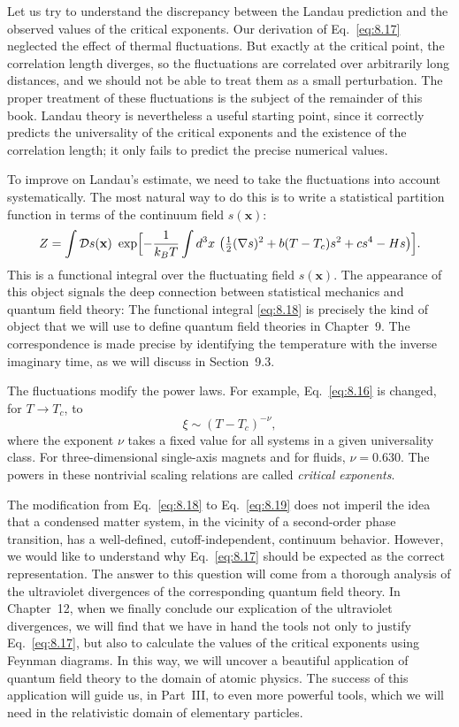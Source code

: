 Let us try to understand the discrepancy between the Landau prediction and
the observed values of the critical exponents.  Our derivation of
Eq.~\eqref{eq:8.17} neglected the effect of thermal fluctuations.  But exactly
at the critical point, the correlation length diverges, so the fluctuations
are correlated over arbitrarily long distances, and we should not be able to
treat them as a small perturbation.  The proper treatment of these
fluctuations is the subject of the remainder of this book.  Landau theory is
nevertheless a useful starting point, since it correctly predicts the
universality of the critical exponents and the existence of the correlation
length; it only fails to predict the precise numerical values.

To improve on Landau's estimate, we need to take the fluctuations into
account systematically.  The most natural way to do this is to write a
statistical partition function in terms of the continuum field $s(\mathbf{x})$:
\begin{equation}
  Z = \int \mathcal{D}s(\mathbf{x})\ \exp\Bigl[ -\frac{1}{k_BT}\int d^3x\
    \bigl( \tfrac{1}{2}(\nabla s)^2 + b(T-T_c)s^2 + cs^4 - Hs \bigr) \Bigr].
  \label{eq:8.18}
\end{equation}
This is a functional integral over the fluctuating field $s(\mathbf{x})$.  The
appearance of this object signals the deep connection between statistical
mechanics and quantum field theory: The functional integral
\eqref{eq:8.18} is precisely the kind of object that we will use to define
quantum field theories in Chapter~9.  The correspondence is made precise by
identifying the temperature with the inverse imaginary time, as we will
discuss in Section~9.3.

The fluctuations modify the power laws.  For example, Eq.~\eqref{eq:8.16}
is changed, for $T \to T_c$, to
\begin{equation}
  \xi \sim (T-T_c)^{-\nu},
  \label{eq:8.19}
\end{equation}
where the exponent $\nu$ takes a fixed value for all systems in a given
universality class.  For three-dimensional single-axis magnets and for fluids,
$\nu = 0.630$.  The powers in these nontrivial scaling relations are called
\emph{critical exponents}.

The modification from Eq.~\eqref{eq:8.18} to Eq.~\eqref{eq:8.19} does not
imperil the idea that a condensed matter system, in the vicinity of a
second-order phase transition, has a well-defined, cutoff-independent,
continuum behavior.  However, we would like to understand why
Eq.~\eqref{eq:8.17} should be expected as the correct representation.  The
answer to this question will come from a thorough analysis of the ultraviolet
divergences of the corresponding quantum field theory.  In Chapter~12, when we
finally conclude our explication of the ultraviolet divergences, we will find
that we have in hand the tools not only to justify Eq.~\eqref{eq:8.17}, but
also to calculate the values of the critical exponents using Feynman diagrams.
In this way, we will uncover a beautiful application of quantum field theory
to the domain of atomic physics.  The success of this application will guide
us, in Part~III, to even more powerful tools, which we will need in the
relativistic domain of elementary particles.
